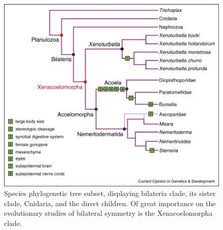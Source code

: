 \begin{figure}
	\centering
	\includegraphics[width=0.9\linewidth]{bilateria_phylum}
	\caption[Bilateria clade \cite{Hejnol2016}]{Species phylogenetic tree subset, displaying bilateria clade, its sister clade, Cnidaria, and the direct children\cite{Hejnol2016}. Of great importance on the evolutionary studies of bilateral symmetry is the Xenacoelomorpha clade.}
	\label{fig:bilateriaphylum}
\end{figure}

